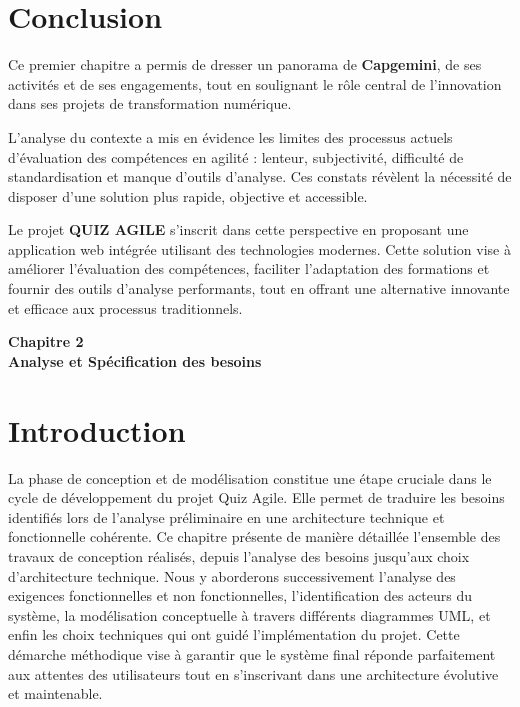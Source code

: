 \documentclass[12pt,a4paper]{report}
\begin{document}
\cleardoublepage
\section{Conclusion}

Ce premier chapitre a permis de dresser un panorama de \textbf{Capgemini}, de ses activités et de ses engagements, tout en soulignant le rôle central de l'innovation dans ses projets de transformation numérique.

L'analyse du contexte a mis en évidence les limites des processus actuels d'évaluation des compétences en agilité : lenteur, subjectivité, difficulté de standardisation et manque d'outils d'analyse. Ces constats révèlent la nécessité de disposer d'une solution plus rapide, objective et accessible.

Le projet \textbf{QUIZ AGILE} s'inscrit dans cette perspective en proposant une application web intégrée utilisant des technologies modernes. Cette solution vise à améliorer l'évaluation des compétences, faciliter l'adaptation des formations et fournir des outils d'analyse performants, tout en offrant une alternative innovante et efficace aux processus traditionnels.


\cleardoublepage
\thispagestyle{empty}
\begin{center}
    \vspace*{4cm}
    {\Huge \textbf{Chapitre 2}}\\[1.5cm]
    {\LARGE \textbf{Analyse et Spécification des besoins}}
\end{center}
\cleardoublepage

\setcounter{section}{0}

\section{Introduction}

La phase de conception et de modélisation constitue une étape cruciale
dans le cycle de développement du projet Quiz Agile. Elle permet de
traduire les besoins identifiés lors de l'analyse
préliminaire en une architecture technique et fonctionnelle cohérente.
Ce chapitre présente de manière détaillée l'ensemble des
travaux de conception réalisés, depuis l'analyse des
besoins jusqu'aux choix d'architecture
technique. Nous y aborderons successivement l'analyse
des exigences fonctionnelles et non fonctionnelles,
l'identification des acteurs du système, la modélisation
conceptuelle à travers différents diagrammes UML, et enfin les choix
techniques qui ont guidé l'implémentation du projet.
Cette démarche méthodique vise à garantir que le système final réponde
parfaitement aux attentes des utilisateurs tout en
s'inscrivant dans une architecture évolutive et
maintenable.
\end{document}
